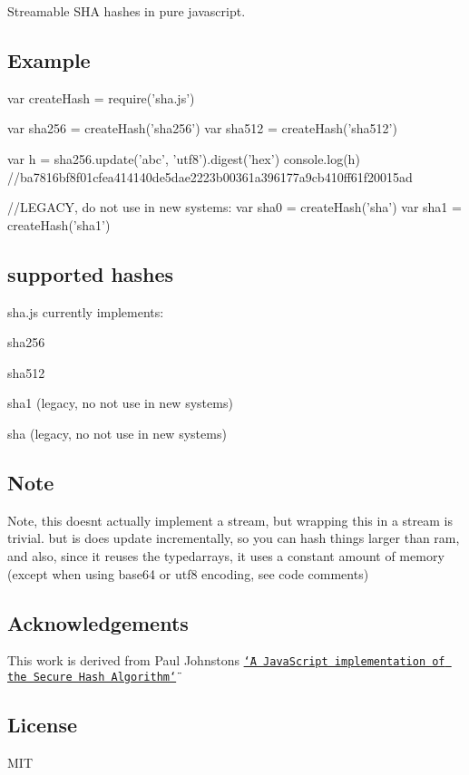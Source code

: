 Streamable S\+HA hashes in pure javascript.

\href{http://travis-ci.org/crypto-browserify/sha.js}{\tt } \href{https://www.npmjs.org/package/sha.js}{\tt }

\subsection*{Example}


\begin{DoxyCode}
var createHash = require('sha.js')

var sha256 = createHash('sha256')
var sha512 = createHash('sha512')

var h = sha256.update('abc', 'utf8').digest('hex')
console.log(h) //ba7816bf8f01cfea414140de5dae2223b00361a396177a9cb410ff61f20015ad

//LEGACY, do not use in new systems:
var sha0 = createHash('sha')
var sha1 = createHash('sha1')
\end{DoxyCode}


\subsection*{supported hashes}

sha.\+js currently implements\+:


\begin{DoxyItemize}
\item sha256
\item sha512
\item sha1 (legacy, no not use in new systems)
\item sha (legacy, no not use in new systems)
\end{DoxyItemize}

\subsection*{Note}

Note, this doesn\textquotesingle{}t actually implement a stream, but wrapping this in a stream is trivial. but is does update incrementally, so you can hash things larger than ram, and also, since it reuses the typedarrays, it uses a constant amount of memory (except when using base64 or utf8 encoding, see code comments)

\subsection*{Acknowledgements}

This work is derived from Paul Johnston\textquotesingle{}s \href{http://pajhome.org.uk/crypt/md5/sha1.html}{\tt \char`\"{}\+A Java\+Script implementation of the Secure Hash Algorithm\char`\"{}}

\subsection*{License}

M\+IT 